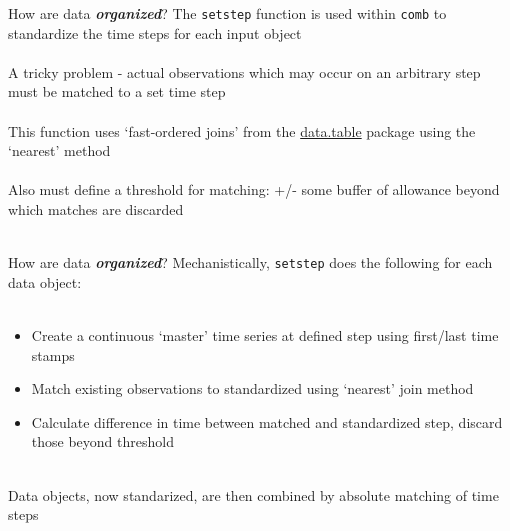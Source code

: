\documentclass[serif]{beamer}\usepackage[]{graphicx}\usepackage[]{color}
\newcommand{\Bigtxt}[1]{\textbf{\textit{#1}}}
\begin{document}
\begin{frame}{How are data \Bigtxt{organized}?}
The \texttt{setstep} function is used within \texttt{comb} to standardize the time steps for each input object \\~\\
A tricky problem - actual observations which may occur on an arbitrary step must be matched to a set time step\\~\\
This function uses `fast-ordered joins' from the \href{http://cran.r-project.org/web/packages/data.table/index.html}{data.table} package using the `nearest' method\\~\\
Also must define a threshold for matching: +/- some buffer of allowance beyond which matches are discarded \\~\\
\end{frame}

\begin{frame}{How are data \Bigtxt{organized}?}
Mechanistically, \texttt{setstep} does the following for each data object: \\~\\
\begin{itemize}
\item Create a continuous `master' time series at defined step using first/last time stamps
\item Match existing observations to standardized using `nearest' join method
\item Calculate difference in time between matched and standardized step, discard those beyond threshold \\~\\
\end{itemize}
Data objects, now standarized, are then combined by absolute matching of time steps
\end{frame}
\end{document}
